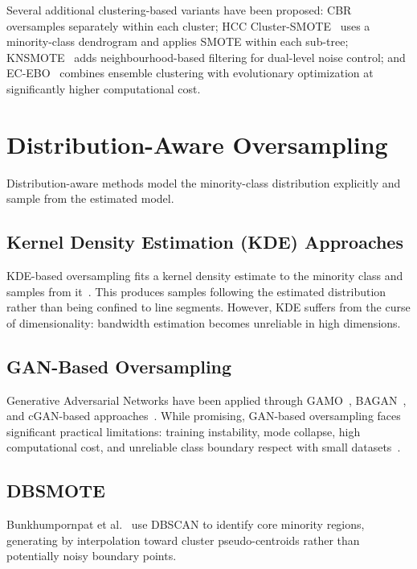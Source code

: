 Several additional clustering-based variants have been proposed: CBR~\cite{jo2004class} oversamples separately within each cluster; HCC Cluster-SMOTE~\cite{arefin2020hcc} uses a minority-class dendrogram and applies SMOTE within each sub-tree; KNSMOTE~\cite{li2024knsmote} adds neighbourhood-based filtering for dual-level noise control; and EC-EBO~\cite{xia2023ecebo} combines ensemble clustering with evolutionary optimization at significantly higher computational cost.


\section{Distribution-Aware Oversampling}
\label{sec:lit:distribution}

Distribution-aware methods model the minority-class distribution explicitly and sample from the estimated model.

\subsection{Kernel Density Estimation (KDE) Approaches}

KDE-based oversampling fits a kernel density estimate to the minority class and samples from it~\cite{guo2008kde}.
This produces samples following the estimated distribution rather than being confined to line segments.
However, KDE suffers from the curse of dimensionality: bandwidth estimation becomes unreliable in high dimensions.

\subsection{GAN-Based Oversampling}

Generative Adversarial Networks have been applied through GAMO~\cite{mullick2019generative}, BAGAN~\cite{mariani2018bagan}, and cGAN-based approaches~\cite{douzas2018effective}.
While promising, GAN-based oversampling faces significant practical limitations: training instability, mode collapse, high computational cost, and unreliable class boundary respect with small datasets~\cite{sharma2022survey}.

\subsection{DBSMOTE}

Bunkhumpornpat et al.~\cite{bunkhumpornpat2012dbsmote} use DBSCAN to identify core minority regions, generating by interpolation toward cluster pseudo-centroids rather than potentially noisy boundary points.


